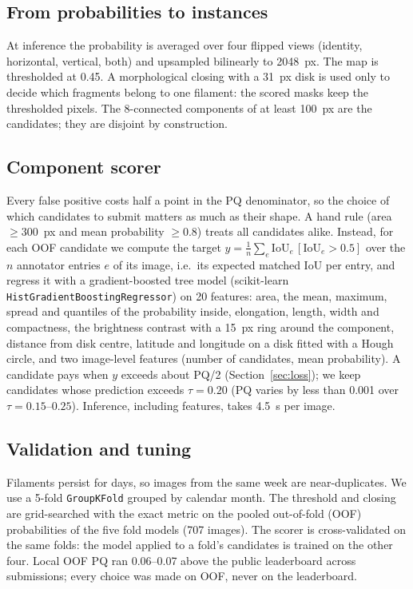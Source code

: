 \documentclass[conference]{IEEEtran}
\begin{document}
\subsection{From probabilities to instances}
At inference the probability is averaged over four flipped views (identity, horizontal, vertical, both)
and upsampled bilinearly to 2048~px. The map is thresholded at 0.45. A morphological closing with a 31~px
disk is used only to decide which fragments belong to one filament: the scored masks keep the thresholded
pixels. The 8-connected components of at least 100~px are the candidates; they are disjoint by construction.

\subsection{Component scorer}
Every false positive costs half a point in the PQ denominator, so the choice of which candidates to submit
matters as much as their shape. A hand rule (area $\geq 300$~px and mean probability $\geq 0.8$) treats all
candidates alike. Instead, for each OOF candidate we compute the target
$y = \frac{1}{n}\sum_{e} \mathrm{IoU}_e \,[\mathrm{IoU}_e > 0.5]$ over the $n$ annotator entries $e$ of its
image, i.e.\ its expected matched IoU per entry, and regress it with a gradient-boosted tree model
(scikit-learn \texttt{HistGradientBoostingRegressor}) on 20 features: area, the mean, maximum, spread and
quantiles of the probability inside, elongation, length, width and compactness, the brightness contrast with
a 15~px ring around the component, distance from disk centre, latitude and longitude on a disk fitted with a
Hough circle, and two image-level features (number of candidates, mean probability). A candidate pays when
$y$ exceeds about PQ/2 (Section~\ref{sec:loss}); we keep candidates whose prediction exceeds $\tau=0.20$
(PQ varies by less than 0.001 over $\tau=0.15$--$0.25$). Inference, including features, takes 4.5~s per image.

\subsection{Validation and tuning}
Filaments persist for days, so images from the same week are near-duplicates. We use a 5-fold
\texttt{GroupKFold} grouped by calendar month. The threshold and closing are grid-searched with the exact
metric on the pooled out-of-fold (OOF) probabilities of the five fold models (707 images). The scorer is
cross-validated on the same folds: the model applied to a fold's candidates is trained on the other four.
Local OOF PQ ran 0.06--0.07 above the public leaderboard across submissions; every choice was made on OOF,
never on the leaderboard.
\end{document}
